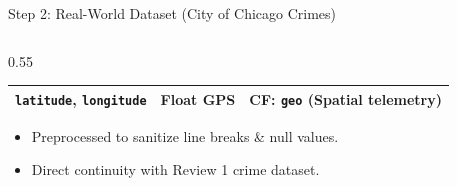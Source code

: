 \documentclass[aspectratio=169]{beamer}
\begin{document}
\begin{frame}{Step 2: Real-World Dataset (City of Chicago Crimes)}
\begin{columns}[T]
\begin{column}{0.55\textwidth}
\begin{table}
\begin{tabular}{p{2.3cm}p{1.0cm}p{3.5cm}}
                    \texttt{latitude}, \texttt{longitude} & Float GPS & \textbf{CF:} \texttt{geo} (Spatial telemetry) \\
                    \bottomrule
                \end{tabular}
            \end{table}
            \vspace{0.04cm}
            \begin{itemize}\footnotesize
                \setlength{\itemsep}{1pt}
                \item Preprocessed to sanitize line breaks \& null values.
                \item Direct continuity with Review 1 crime dataset.
            \end{itemize}
        \end{column}
    \end{columns}
\end{frame}
\end{document}
